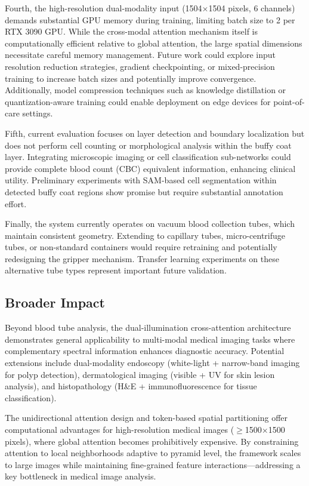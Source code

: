 \documentclass[journal,twoside,web]{ieeecolor}
\begin{document}
Fourth, the high-resolution dual-modality input (1504$\times$1504 pixels, 6 channels) demands substantial GPU memory during training, limiting batch size to 2 per RTX 3090 GPU. While the cross-modal attention mechanism itself is computationally efficient relative to global attention, the large spatial dimensions necessitate careful memory management. Future work could explore input resolution reduction strategies, gradient checkpointing, or mixed-precision training to increase batch sizes and potentially improve convergence. Additionally, model compression techniques such as knowledge distillation or quantization-aware training could enable deployment on edge devices for point-of-care settings.

Fifth, current evaluation focuses on layer detection and boundary localization but does not perform cell counting or morphological analysis within the buffy coat layer. Integrating microscopic imaging or cell classification sub-networks could provide complete blood count (CBC) equivalent information, enhancing clinical utility. Preliminary experiments with SAM-based cell segmentation within detected buffy coat regions show promise but require substantial annotation effort.

Finally, the system currently operates on vacuum blood collection tubes, which maintain consistent geometry. Extending to capillary tubes, micro-centrifuge tubes, or non-standard containers would require retraining and potentially redesigning the gripper mechanism. Transfer learning experiments on these alternative tube types represent important future validation.

\subsection{Broader Impact}

Beyond blood tube analysis, the dual-illumination cross-attention architecture demonstrates general applicability to multi-modal medical imaging tasks where complementary spectral information enhances diagnostic accuracy. Potential extensions include dual-modality endoscopy (white-light + narrow-band imaging for polyp detection), dermatological imaging (visible + UV for skin lesion analysis), and histopathology (H\&E + immunofluorescence for tissue classification).

The unidirectional attention design and token-based spatial partitioning offer computational advantages for high-resolution medical images ($\geq$1500$\times$1500 pixels), where global attention becomes prohibitively expensive. By constraining attention to local neighborhoods adaptive to pyramid level, the framework scales to large images while maintaining fine-grained feature interactions—addressing a key bottleneck in medical image analysis.
\end{document}
